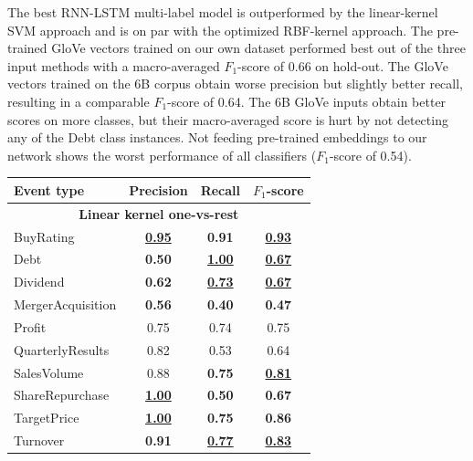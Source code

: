 \documentclass[11pt,a4paper]{article}
\begin{document}
The best RNN-LSTM multi-label model is outperformed by the linear-kernel SVM approach and is on par with the optimized RBF-kernel approach.
The pre-trained GloVe vectors trained on our own dataset performed best out of the three input methods with a macro-averaged $F_1$-score of 0.66 on hold-out.
The GloVe vectors trained on the 6B corpus obtain worse precision but slightly better recall, resulting in a comparable $F_1$-score of 0.64.
The 6B GloVe inputs obtain better scores on more classes, but their macro-averaged score is hurt by not detecting any of the Debt class instances.
Not feeding pre-trained embeddings to our network shows the worst performance of all classifiers ($F_1$-score of 0.54).

\begin{table}[!htb]
	\centering
	\small{
		\begin{tabular}{p{2.8cm} c c c} 
			\textbf{Event type} & \textbf{Precision}        & \textbf{Recall}           & \textbf{$F_1$-score}      \\ 
			\hline
			\multicolumn{4}{c}{\textbf{Linear kernel one-vs-rest} } \\
			\hline
			BuyRating           & \underline{\textbf{0.95}} & \textbf{0.91}             & \underline{\textbf{0.93}} \\
			Debt                & \textbf{0.50}             & \underline{\textbf{1.00}} & \underline{\textbf{0.67}} \\
			Dividend            & \textbf{0.62}             & \underline{\textbf{0.73}} & \underline{\textbf{0.67}} \\
			MergerAcquisition   & \textbf{0.56}             & \textbf{0.40}             & \textbf{0.47}             \\
			Profit              & 0.75                      & 0.74                      & 0.75                      \\
			QuarterlyResults    & 0.82                      & 0.53                      & 0.64                      \\
			SalesVolume         & 0.88                      & \textbf{0.75}             & \underline{\textbf{0.81}} \\
			ShareRepurchase     & \underline{\textbf{1.00}} & \textbf{0.50}             & \textbf{0.67}             \\ 
			TargetPrice         & \underline{\textbf{1.00}} & \textbf{0.75}             & \textbf{0.86}             \\
			Turnover            & \textbf{0.91}             & \underline{\textbf{0.77}} & \underline{\textbf{0.83}} \\

\end{tabular}}
\end{table}
\end{document}
